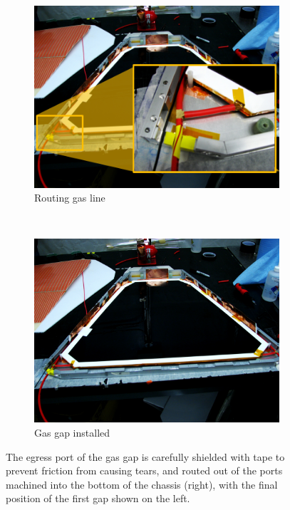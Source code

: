 \begin{figure}
  \centering
  \begin{subfigure}[b]{0.5\textwidth}
    \centering
    \includegraphics[width=\linewidth]{./figures/rpc1_construction_4b.jpg}
    \caption{Routing gas line}
    \label{fig:rpc1_bottom_gas_line_detail}
  \end{subfigure}%
  ~
  \begin{subfigure}[b]{0.5\textwidth}
    \centering
    \includegraphics[width=\linewidth]{./figures/rpc1_construction_4.jpg}
    \caption{Gas gap installed}
    \label{fig:rpc1_bottom_gap_installed}
  \end{subfigure}
  \caption{
    The egress port of the gas gap is carefully shielded with tape to prevent
    friction from causing tears, and routed out of the ports machined into the
    bottom of the chassis (right), with the final position of the first gap
    shown on the left.
  }
  \label{fig:rpc1_bottom_gap_installation}
\end{figure}

